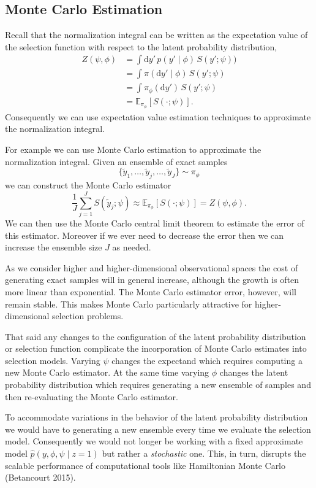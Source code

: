 \documentclass[
  letterpaper,
  DIV=11,
  numbers=noendperiod]{scrartcl}
\begin{document}
\subsection{Monte Carlo Estimation}\label{monte-carlo-estimation}

Recall that the normalization integral can be written as the expectation
value of the selection function with respect to the latent probability
distribution, \begin{align*}
Z(\psi, \phi)
&=
\int \mathrm{d}y' \, p(y' \mid \phi ) \, S(y'; \psi ))
\\
&=
\int \pi( \mathrm{d}y' \mid \phi) \, S(y'; \psi )
\\
&=
\int \pi_{\phi}( \mathrm{d}y' ) \, S(y'; \psi )
\\
&=
\mathbb{E}_{\pi_{\phi}}[ S(\cdot ; \psi) ].
\end{align*} Consequently we can use expectation value estimation
techniques to approximate the normalization integral.

For example we can use Monte Carlo estimation to approximate the
normalization integral. Given an ensemble of exact samples \[
\{ \tilde{y}_{1}, \ldots, \tilde{y}_{j}, \ldots, \tilde{y}_{J} \}
\sim \pi_{\phi}
\] we can construct the Monte Carlo estimator \[
\frac{1}{J} \sum_{j = 1}^{J} S(\tilde{y}_{j}; \psi)
\approx
\mathbb{E}_{\pi_{\phi}}[ S(\cdot ; \psi) ]
=
Z(\psi, \phi).
\] We can then use the Monte Carlo central limit theorem to estimate the
error of this estimator. Moreover if we ever need to decrease the error
then we can increase the ensemble size \(J\) as needed.

As we consider higher and higher-dimensional observational spaces the
cost of generating exact samples will in general increase, although the
growth is often more linear than exponential. The Monte Carlo estimator
error, however, will remain stable. This makes Monte Carlo particularly
attractive for higher-dimensional selection problems.

That said any changes to the configuration of the latent probability
distribution or selection function complicate the incorporation of Monte
Carlo estimates into selection models. Varying \(\psi\) changes the
expectand which requires computing a new Monte Carlo estimator. At the
same time varying \(\phi\) changes the latent probability distribution
which requires generating a new ensemble of samples and then
re-evaluating the Monte Carlo estimator.

To accommodate variations in the behavior of the latent probability
distribution we would have to generating a new ensemble every time we
evaluate the selection model. Consequently we would not longer be
working with a fixed approximate model
\(\hat{p}(y, \phi, \psi \mid z = 1)\) but rather a \emph{stochastic}
one. This, in turn, disrupts the scalable performance of computational
tools like Hamiltonian Monte Carlo (Betancourt 2015).
\end{document}
